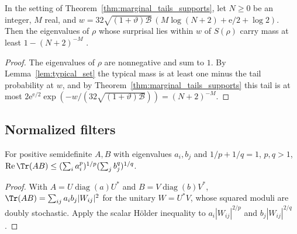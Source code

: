 \begin{theorem}
    \label{thm:marginal_tails_typical_mass}
    \leanok
    In the setting of Theorem~\ref{thm:marginal_tails_supports}, let $N\ge0$ be an
    integer, $M$ real, and
    $w=32\sqrt{(1+\vartheta)\mathcal B}\,(M\log(N+2)+\mathrm e/2+\log2)$. Then the
    eigenvalues of $\rho$ whose surprisal lies within $w$ of $S(\rho)$ carry mass at
    least $1-(N+2)^{-M}$ \cite[Section~3]{OpenAI2026AreaLaw}.
\end{theorem}
\begin{proof}\leanok
    The eigenvalues of $\rho$ are nonnegative and sum to $1$. By
    Lemma~\ref{lem:typical_set} the typical mass is at least one minus the tail
    probability at $w$, and by Theorem~\ref{thm:marginal_tails_supports} this tail
    is at most
    $2\mathrm e^{\mathrm e/2}\exp(-w/(32\sqrt{(1+\vartheta)\mathcal B}))=(N+2)^{-M}$.
\end{proof}

\subsection{Normalized filters}
\label{sec:marginal_tails_filters}

\begin{lemma}
    \label{lem:trace_holder}
    \leanok
    For positive semidefinite $A,B$ with eigenvalues $a_i,b_j$ and
    $1/p+1/q=1$, $p,q>1$,
    $\operatorname{Re}\Tr(AB)\le(\sum_ia_i^p)^{1/p}(\sum_jb_j^q)^{1/q}$.
\end{lemma}
\begin{proof}\leanok
    With $A=U\operatorname{diag}(a)U^*$ and $B=V\operatorname{diag}(b)V^*$,
    $\Tr(AB)=\sum_{ij}a_ib_j|W_{ij}|^2$ for the unitary $W=U^*V$, whose squared
    moduli are doubly stochastic. Apply the scalar Hölder inequality to
    $a_i|W_{ij}|^{2/p}$ and $b_j|W_{ij}|^{2/q}$.
\end{proof}

